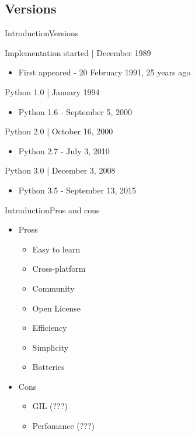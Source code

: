 \documentclass[10pt]{beamer}
\begin{document}
\subsection{Versions}
\begin{frame}{Introduction}{Versions}
	\begin{block}{Implementation started | December 1989}
		\begin{itemize}
			\item First appeared - 20 February 1991, 25 years ago
		\end{itemize}
	\end{block}	
		
	\begin{block}{Python 1.0 | January 1994}
		\begin{itemize}
			\item Python 1.6 - September 5, 2000
		\end{itemize}
	\end{block}	
	
	\begin{block}{Python 2.0 | October 16, 2000}
		\begin{itemize}
			\item Python 2.7 - July 3, 2010
		\end{itemize}
	\end{block}
	
	\begin{block}{Python 3.0 | December 3, 2008}
		\begin{itemize}
			\item Python 3.5 - September 13, 2015
		\end{itemize}
	\end{block}
\end{frame}


\begin{frame}{Introduction}{Pros and cons}
	\begin{itemize}
		\item Pross
		\begin{itemize}
			\item Easy to learn
			\item Cross-platform
			\item Community
			\item Open License
			\item Efficiency
			\item Simplicity
			\item Batteries
		\end{itemize}
		
		
		\item Cons
		\begin{itemize}
			\item GIL (???)
			\item Perfomance (???)
		\end{itemize}
		
	\end{itemize}	
\end{frame}
\end{document}
